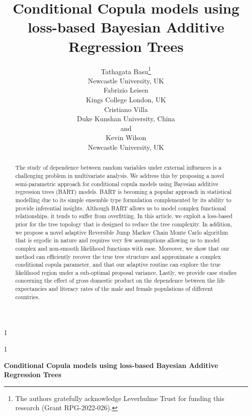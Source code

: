 \documentclass[
12pt]{article}
\newcommand{\anon}{1}
\begin{document}
	
	
	\def\spacingset#1{\renewcommand{\baselinestretch}%
		{#1}\small\normalsize} \spacingset{1}
	
	
	
	
	\anon
	{
		\title{\bf Conditional Copula models using loss-based Bayesian Additive Regression Trees}
		\author{Tathagata Basu\thanks{
				The authors gratefully acknowledge Leverhulme Trust for funding this research (Grant RPG-2022-026).}\hspace{.2cm}\\
			Newcastle University, UK\\
			Fabrizio Leisen \\
			Kings College London, UK\\
			Cristiano Villa \\
			Duke Kunshan University, China\\
			and \\
			Kevin Wilson \\
			Newcastle University, UK}
		\maketitle
	} \fi
	
	\anon
	{
		\bigskip
		\bigskip
		\bigskip
		\begin{center}
			{\LARGE\bf Conditional Copula models using loss-based Bayesian Additive Regression Trees}
		\end{center}
		\medskip
	} \fi
	
	\bigskip
	\begin{abstract}
		The study of dependence between random variables under external influences is a challenging problem in multivariate analysis. We address this by proposing a novel semi-parametric approach for conditional copula models using Bayesian additive regression trees (BART) models. BART is becoming a popular approach in statistical modelling due to its simple ensemble type formulation complemented by its ability to provide inferential insights. Although BART allows us to model complex functional relationships, it tends to suffer from overfitting. In this article, we exploit a loss-based prior for the tree topology that is designed to reduce the tree complexity. In addition, we propose a novel adaptive Reversible Jump Markov Chain Monte Carlo algorithm that is ergodic in nature and requires very few assumptions allowing us to model complex and non-smooth likelihood functions with ease. Moreover, we show that our method can efficiently recover the true tree structure and approximate a complex conditional copula parameter, and that our adaptive routine can explore the true likelihood region under a sub-optimal proposal variance. Lastly, we provide case studies concerning the effect of gross domestic product on the dependence between the life expectancies and literacy rates of the male and female populations of different countries.
		
	\end{abstract}
	
\end{document}
